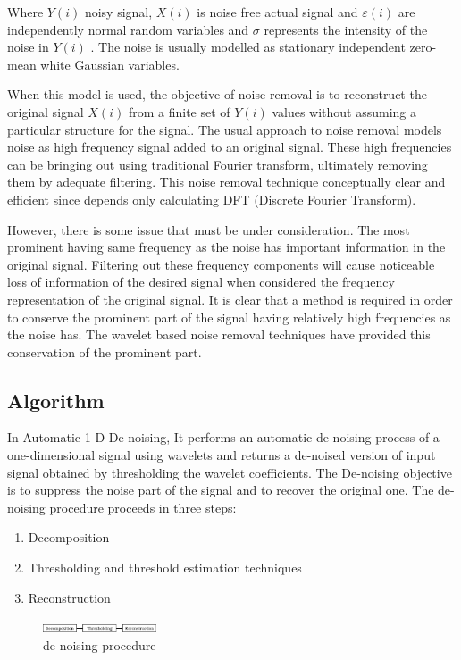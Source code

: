 \documentclass[12pt, a4paper, twoside]{report}
\begin{document}
Where $Y(i)$ noisy signal,  $X(i)$  is noise free actual signal and  $\varepsilon(i)$ are independently normal random variables and  $\sigma$ represents the intensity of the noise in $Y(i)$  . The noise is usually modelled as stationary independent zero-mean white Gaussian variables.
\par
When this model is used, the objective of noise removal is to reconstruct the original signal $X(i)$  from a finite set of $Y(i)$  values without assuming a particular structure for the signal. The usual approach to noise removal models noise as high frequency signal added to an original signal. These high frequencies can be bringing out using traditional Fourier transform, ultimately removing them by adequate filtering. This noise removal technique conceptually clear and efficient since depends only calculating DFT (Discrete Fourier Transform).
\par
However, there is some issue that must be under consideration. The most prominent having same frequency as the noise has important information in the original signal. Filtering out these frequency components will cause noticeable loss of information of the desired signal when considered the frequency representation of the original signal. It is clear that a method is required in order to conserve the prominent part of the signal having relatively high frequencies as the noise has. The wavelet based noise removal techniques have provided this conservation of the prominent part.

\subsection{Algorithm}
In Automatic 1-D De-noising, It performs an automatic 
de-noising process of a one-dimensional  signal  using wavelets  and  returns  a  de-noised  version of  input  signal  obtained  by  thresholding the  wavelet  coefficients.  The  De-noising objective  is  to  suppress  the  noise  part  of the  signal  and  to  recover  the  original one. The de-noising procedure proceeds in three steps:
\begin{enumerate}
\item Decomposition
\item Thresholding and threshold estimation techniques 
\item Reconstruction
\end{enumerate}

\begin{figure}[!h]
	\centering
	\includegraphics[width=0.3\textwidth]
	{images/chapter3/denoise-proc}
	\caption{de-noising procedure}
	\label{fig:denoise-proc}
\end{figure}
\end{document}
